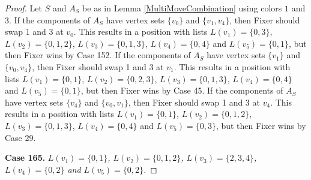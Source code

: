 \documentclass[12pt]{amsart}
\theoremstyle{plain}
\theoremstyle{definition}
\theoremstyle{remark}
\begin{document}
\begin{proof}
Let $S$ and $A_S$ be as in Lemma \ref{MultiMoveCombination} using colors $1$ and $3$. If the components of $A_S$ have vertex sets $\{v_0\}$ and $\{v_1, v_4\}$, then Fixer should swap 1 and 3 at $v_0$. This results in a position with lists $L(v_1) = \{0, 3\}$, $L(v_2) = \{0, 1, 2\}$, $L(v_3) = \{0, 1, 3\}$, $L(v_4) = \{0, 4\}$ and $L(v_5) = \{0, 1\}$, but then Fixer wins by Case 152.
If the components of $A_S$ have vertex sets $\{v_1\}$ and $\{v_0, v_4\}$, then Fixer should swap 1 and 3 at $v_1$. This results in a position with lists $L(v_1) = \{0, 1\}$, $L(v_2) = \{0, 2, 3\}$, $L(v_3) = \{0, 1, 3\}$, $L(v_4) = \{0, 4\}$ and $L(v_5) = \{0, 1\}$, but then Fixer wins by Case 45.
If the components of $A_S$ have vertex sets $\{v_4\}$ and $\{v_0, v_1\}$, then Fixer should swap 1 and 3 at $v_4$. This results in a position with lists $L(v_1) = \{0, 1\}$, $L(v_2) = \{0, 1, 2\}$, $L(v_3) = \{0, 1, 3\}$, $L(v_4) = \{0, 4\}$ and $L(v_5) = \{0, 3\}$, but then Fixer wins by Case 29.

\noindent\textbf{Case 165.  }\textit{$L(v_1) = \{0, 1\}$, $L(v_2) = \{0, 1, 2\}$, $L(v_3) = \{2, 3, 4\}$, $L(v_4) = \{0, 2\}$ and $L(v_5) = \{0, 2\}$.}


\end{proof}
\end{document}
